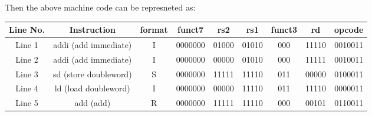 \documentclass[addpoints]{exam}
\begin{document}
\begin{sloppypar}
\begin{questions}
\begin{solution}
\begin{parts}
            Then the above machine code can be represneted as:
        \end{parts}
        \begin{tabular}{|c|c|c|c|c|c|c|c|c|}
            \hline
            \textbf{Line No.} & \textbf{Instruction} & \textbf{format} & \textbf{funct7} & \textbf{rs2} & \textbf{rs1} & \textbf{funct3} & \textbf{rd} & \textbf{opcode} \\ 
            \hline 
            Line 1 & addi (add immediate) & I & 0000000 & 01000 & 01010 & 000 & 11110 & 0010011 \\ 
            \hline
            Line 2 & addi (add immediate) & I & 0000000 & 00000 & 01010 & 000 & 11111 & 0010011 \\ 
            \hline
            Line 3 & sd (store doubleword) & S & 0000000 & 11111 & 11110 & 011 & 00000 & 0100011 \\ 
            \hline
            Line 4 & ld (load doubleword) & I & 0000000 & 00000 & 11110 & 011 & 11110 & 0000011 \\ 
            \hline
            Line 5 & add (add) & R & 0000000 & 11111 & 11110 & 000 & 00101 & 0110011 \\ 
            \hline
        \end{tabular}
    \end{solution}
\end{questions}
\end{sloppypar}
\end{document}
